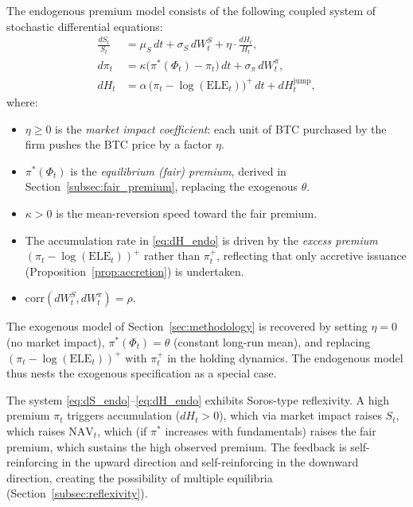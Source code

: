 \begin{definition}\label{def:endo_sdes}
The endogenous premium model consists of the following coupled system of
stochastic differential equations:
\begin{align}
  \frac{dS_t}{S_t} &= \mu_S\, dt + \sigma_S\, dW_t^S
    + \eta \cdot \frac{dH_t}{H_t},
    \label{eq:dS_endo} \\[6pt]
  d\pi_t &= \kappa\bigl(\pi^*(\Phi_t) - \pi_t\bigr)\, dt
    + \sigma_\pi\, dW_t^\pi,
    \label{eq:dpi_endo} \\[6pt]
  dH_t &= \alpha\, \bigl(\pi_t - \log(\mathrm{ELE}_t)\bigr)^+\, dt
    + dH_t^{\mathrm{jump}},
    \label{eq:dH_endo}
\end{align}
where:
\begin{itemize}
  \item $\eta \ge 0$ is the \emph{market impact coefficient}: each unit of
    BTC purchased by the firm pushes the BTC price by a factor $\eta$.
  \item $\pi^*(\Phi_t)$ is the \emph{equilibrium (fair) premium}, derived
    in Section~\ref{subsec:fair_premium}, replacing the exogenous $\theta$.
  \item $\kappa > 0$ is the mean-reversion speed toward the fair premium.
  \item The accumulation rate in \eqref{eq:dH_endo} is driven by the
    \emph{excess premium} $(\pi_t - \log(\mathrm{ELE}_t))^+$ rather than
    $\pi_t^+$, reflecting that only accretive issuance
    (Proposition~\ref{prop:accretion}) is undertaken.
  \item $\mathrm{corr}(dW_t^S, dW_t^\pi) = \rho$.
\end{itemize}
\end{definition}

\begin{remark}\label{rem:comparison}
The exogenous model of Section~\ref{sec:methodology} is recovered by setting
$\eta = 0$ (no market impact), $\pi^*(\Phi_t) = \theta$ (constant long-run
mean), and replacing $(\pi_t - \log(\mathrm{ELE}_t))^+$ with $\pi_t^+$ in
the holding dynamics.  The endogenous model thus nests the exogenous
specification as a special case.
\end{remark}

\begin{remark}\label{rem:reflexive}
The system \eqref{eq:dS_endo}--\eqref{eq:dH_endo} exhibits Soros-type
reflexivity.  A high premium $\pi_t$ triggers accumulation ($dH_t > 0$),
which via market impact raises $S_t$, which raises $\mathrm{NAV}_t$, which
(if $\pi^*$ increases with fundamentals) raises the fair premium, which
sustains the high observed premium.  The feedback is self-reinforcing in
the upward direction and self-reinforcing in the downward direction, creating
the possibility of multiple equilibria (Section~\ref{subsec:reflexivity}).
\end{remark}

